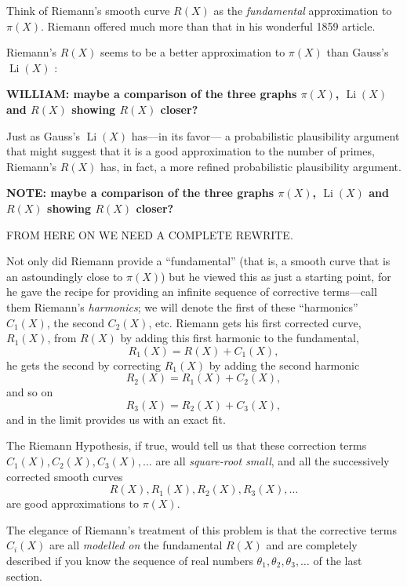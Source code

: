 \documentclass[11pt]{article}
\DeclareMathOperator{\Li}{Li}
\theoremstyle{plain}
\theoremstyle{definition}
\numberwithin{equation}{section}
\numberwithin{figure}{section}
\numberwithin{table}{section}
\begin{document}
{Think of Riemann's smooth curve $R(X)$ as the {\em fundamental}
approximation to $\pi(X)$. Riemann offered much more than that in his
wonderful 1859 article.
  

  Riemann's $R(X)$ seems to be a better approximation to $\pi(X)$ than Gauss's $\Li(X)$ :
  
   
\bigskip

{\bf WILLIAM: maybe a comparison of the three graphs $\pi(X)$, $\Li(X)$ and $R(X)$ showing $R(X)$ closer?}


   
\bigskip

Just as Gauss's $\Li(X)$ has---in its favor--- a probabilistic
plausibility argument that might suggest that it is a good
approximation to the number of primes, Riemann's $R(X)$ has, in fact,
a more refined probabilistic plausibility argument.


   
\bigskip

{\bf NOTE: maybe a comparison of the three graphs $\pi(X)$, $\Li(X)$ and $R(X)$ showing $R(X)$ closer?}


   
\bigskip
  
\centerline{FROM HERE ON WE NEED A COMPLETE REWRITE.}

\bigskip


Not only did Riemann provide a ``fundamental'' (that is, a smooth curve
that is an astoundingly close to $\pi(X)$) but he viewed this as just a
starting point, for he gave the recipe for providing an infinite
sequence of corrective terms---call them Riemann's {\em harmonics}; we
will denote the first of these ``harmonics'' $C_1(X)$, the second
$C_2(X)$, etc.  Riemann gets his first corrected curve, $R_1(X)$, from
$R(X)$ by adding this first harmonic to the fundamental, $$R_1(X) =
R(X) + C_1(X),$$ he gets the second by correcting $R_1(X)$ by adding
the second harmonic $$R_2(X) = R_1 (X) + C_2(X),$$ and so on $$R_3(X)
= R_2 (X) + C_3(X),$$ and in the limit provides us with an exact fit.

The Riemann Hypothesis, if true, would tell us that these correction
terms $C_1(X), C_2(X),C_3(X),\dots$ are all {\em square-root small},
and all the successively corrected smooth curves $$R(X), R_1(X),
R_2(X),R_3(X),\dots$$ are good approximations to $\pi(X)$.

\bigskip

The elegance of Riemann's treatment of this problem is that the
corrective terms $C_i(X)$ are all {\em modelled on} the fundamental
$R(X)$ and are completely described if you know the sequence of real
numbers $\theta_1, \theta_2, \theta_3,\dots$ of the last section.


}
\end{document}
